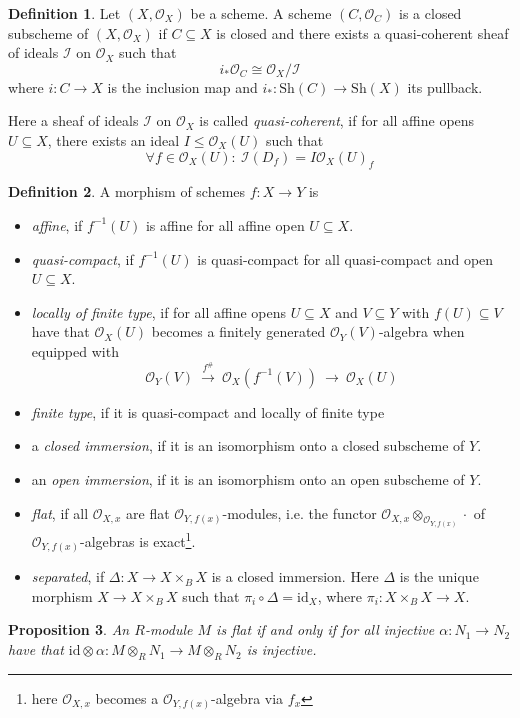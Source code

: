 \documentclass{scrartcl}
\renewcommand{\O}{\mathcal{O}}
\newtheorem{prop}{Proposition}[section]
\theoremstyle{definition}
\newtheorem{definition}[prop]{Definition}
\begin{document}
\begin{definition}
    Let $(X, \O_X)$ be a scheme.
    A scheme $(C, \O_C)$ is a closed subscheme of $(X, \O_X)$ if $C \subseteq X$ is closed and there exists a quasi-coherent sheaf of ideals $\mathcal{I}$ on $\O_X$ such that
    \begin{equation*}
        i_*\O_C \cong \O_X/\mathcal{I}
    \end{equation*}
    where $i: C \to X$ is the inclusion map and $i_*: \mathrm{Sh}(C) \to \mathrm{Sh}(X)$ its pullback.

    Here a sheaf of ideals $\mathcal{I}$ on $\O_X$ is called \emph{quasi-coherent}, if for all affine opens $U \subseteq X$, there exists an ideal $I \leq \O_X(U)$ such that
    \begin{equation*}
        \forall f \in \O_X(U): \ \mathcal{I}(D_f) = I \mathcal{O}_X(U)_f
    \end{equation*}
\end{definition}

\begin{definition}
    A morphism of schemes $f: X \to Y$ is
    \begin{itemize}
        \item \emph{affine}, if $f^{-1}(U)$ is affine for all affine open $U \subseteq X$.
        \item \emph{quasi-compact}, if $f^{-1}(U)$ is quasi-compact for all quasi-compact and open $U \subseteq X$.
        \item \emph{locally of finite type}, if for all affine opens $U \subseteq X$ and $V \subseteq Y$ with $f(U) \subseteq V$ have that $\O_X(U)$ becomes a finitely generated $\O_Y(V)$-algebra when equipped with 
        \begin{equation*}
            \O_Y(V) \ \overset{f^\#}{\to} \ \O_X(f^{-1}(V)) \ \to \ \O_X(U)
        \end{equation*}
        \item \emph{finite type}, if it is quasi-compact and locally of finite type
        \item a \emph{closed immersion}, if it is an isomorphism onto a closed subscheme of $Y$.
        \item an \emph{open immersion}, if it is an isomorphism onto an open subscheme of $Y$.
        \item \emph{flat}, if all $\O_{X, x}$ are flat $\O_{Y, f(x)}$-modules, i.e. the functor $\O_{X, x} \otimes_{\O_{Y, f(x)}} \cdot$ of $\O_{Y, f(x)}$-algebras is exact\footnote{here $\O_{X, x}$ becomes a $\O_{Y, f(x)}$-algebra via $f_x$}.
        \item \emph{separated}, if $\Delta: X \to X \times_B X$ is a closed immersion.
        Here $\Delta$ is the unique morphism $X \to X \times_B X$ such that $\pi_i \circ \Delta = \mathrm{id}_X$, where $\pi_i: X \times_B X \to X$.
    \end{itemize}
\end{definition}

\begin{prop}
    An $R$-module $M$ is flat if and only if for all injective $\alpha: N_1 \to N_2$ have that $\mathrm{id} \otimes \alpha: M \otimes_R N_1 \to M \otimes_R N_2$ is injective.
\end{prop}
\end{document}
